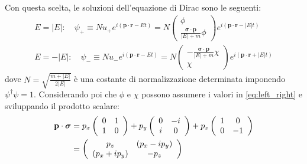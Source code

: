 \documentclass{subnucbo}
\begin{document}
                Con questa scelta, le soluzioni dell'equazione di Dirac sono le seguenti:
                \begin{subequations}
                        \begin{align}
                                E = | E | : \quad \psi _ { + } \equiv N u _ { + } e ^ { i ( \mathbf { p } \cdot \mathbf { r } - E t ) } = N \left( \begin{array} { c } { \phi } \\ { \frac { \boldsymbol{\sigma} \cdot \mathbf { p } } { | E | + m } \phi } \end{array} \right) e ^ { i ( \mathbf { p } \cdot \mathbf { r } - | E | t ) } \\
                                E = - | E | : \quad \psi _ { - } \equiv N u _ { - } e ^ { i ( \mathbf { p } \cdot \mathbf { r } - E t ) } = N \left( \begin{array} { c } { - \frac { \boldsymbol{\sigma} \cdot \mathbf { p } } { | E | + m } \chi } \\ { \chi } \end{array} \right) e ^ { i ( \mathbf { p } \cdot \mathbf { r } + | E | t ) }
                        \end{align}
                        \label{eq:dirac_sol}
                \end{subequations}
                dove $N = \sqrt { \frac { m + | E | } { 2 | E | } }$ è una costante di normalizzazione determinata imponendo $\psi ^ { \dagger } \psi = 1$. Considerando poi che $\phi$ e $\chi$ possono assumere i valori in \ref{eq:left_right} e sviluppando il prodotto scalare:
                \begin{equation}
                        \begin{aligned} \mathbf { p } \cdot \boldsymbol{\sigma} & = p _ { x } \left( \begin{array} { c c } { 0 } & { 1 } \\ { 1 } & { 0 } \end{array} \right) + p _ { y } \left( \begin{array} { c c } { 0 } & { - i } \\ { i } & { 0 } \end{array} \right) + p _ { z } \left( \begin{array} { c c } { 1 } & { 0 } \\ { 0 } & { - 1 } \end{array} \right) \\ & = \left( \begin{array} { c c } { p _ { z } } & { \left( p _ { x } - i p _ { y } \right) } \\ { \left( p _ { x } + i p _ { y } \right) } & { - p _ { z } } \end{array} \right) \end{aligned}
                        \label{eq:p_sigma}
                \end{equation}
\end{document}
